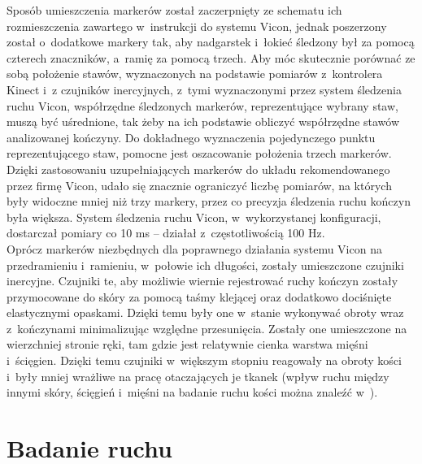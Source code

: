 Sposób umieszczenia markerów został zaczerpnięty ze schematu ich rozmieszczenia zawartego w~instrukcji do systemu Vicon, jednak poszerzony został o~dodatkowe markery tak, aby nadgarstek i~łokieć śledzony był za pomocą czterech znaczników, a~ramię za pomocą trzech. Aby móc skutecznie porównać ze sobą położenie stawów, wyznaczonych na podstawie pomiarów z~kontrolera Kinect i~z czujników inercyjnych, z~tymi wyznaczonymi przez system śledzenia ruchu Vicon, współrzędne śledzonych markerów, reprezentujące wybrany staw, muszą być uśrednione, tak żeby na ich podstawie obliczyć współrzędne stawów analizowanej kończyny. Do dokładnego wyznaczenia pojedynczego punktu reprezentującego staw, pomocne jest oszacowanie położenia trzech markerów. Dzięki zastosowaniu uzupełniających markerów do układu rekomendowanego przez firmę Vicon, udało się znacznie ograniczyć liczbę pomiarów, na których były widoczne mniej niż trzy markery, przez co precyzja śledzenia ruchu kończyn była większa. System śledzenia ruchu Vicon, w~wykorzystanej konfiguracji, dostarczał pomiary co 10 ms -- działał z~częstotliwością 100 Hz.  \\ 
				
Oprócz markerów niezbędnych dla poprawnego działania systemu Vicon na przedramieniu i~ramieniu, w~połowie ich długości, zostały umieszczone czujniki inercyjne. Czujniki te, aby możliwie wiernie rejestrować ruchy kończyn zostały przymocowane do skóry za pomocą taśmy klejącej oraz dodatkowo dociśnięte elastycznymi opaskami. Dzięki temu były one w~stanie wykonywać obroty wraz z~kończynami minimalizując względne przesunięcia. Zostały one umieszczone na wierzchniej stronie ręki, tam gdzie jest relatywnie cienka warstwa mięśni i~ścięgien. Dzięki temu czujniki w~większym stopniu reagowały na obroty kości i~były mniej wrażliwe na pracę otaczających je tkanek (wpływ ruchu między innymi skóry, ścięgień i~mięśni na badanie ruchu kości można znaleźć w~\cite{Sati2016,Reinschmidt2016}).
				
\section{Badanie ruchu}
				
